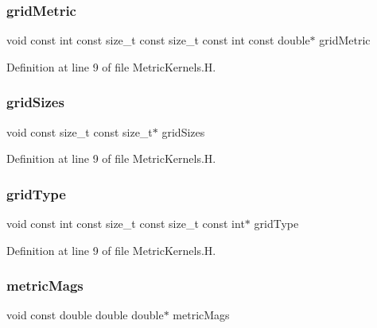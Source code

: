 \subsubsection{\texorpdfstring{grid\+Metric}{gridMetric}}
{\footnotesize\ttfamily void const int const size\+\_\+t const size\+\_\+t const int const double$\ast$ grid\+Metric}



Definition at line 9 of file Metric\+Kernels.\+H.

\hypertarget{MetricKernels_8H_a25bd939310952328c7c4d614148b0d63}{}\label{MetricKernels_8H_a25bd939310952328c7c4d614148b0d63} 
\subsubsection{\texorpdfstring{grid\+Sizes}{gridSizes}}
{\footnotesize\ttfamily void const size\+\_\+t const size\+\_\+t$\ast$ grid\+Sizes}



Definition at line 9 of file Metric\+Kernels.\+H.

\hypertarget{MetricKernels_8H_a124af8cd8a3a1ae247f47d3e526ae4c5}{}\label{MetricKernels_8H_a124af8cd8a3a1ae247f47d3e526ae4c5} 
\subsubsection{\texorpdfstring{grid\+Type}{gridType}}
{\footnotesize\ttfamily void const int const size\+\_\+t const size\+\_\+t const int$\ast$ grid\+Type}



Definition at line 9 of file Metric\+Kernels.\+H.

\hypertarget{MetricKernels_8H_aba6c9360151f4fd828af1b31d0fe65b3}{}\label{MetricKernels_8H_aba6c9360151f4fd828af1b31d0fe65b3} 
\subsubsection{\texorpdfstring{metric\+Mags}{metricMags}}
{\footnotesize\ttfamily void const double double double$\ast$ metric\+Mags}



